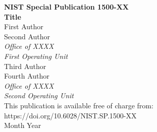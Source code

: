 \documentclass[12pt]{article}
\newcommand{\pubnumber}{1500-XX}
\newcommand{\DOI}{https://doi.org/10.6028/NIST.SP.1500-XX}
\newcommand{\monthyear}{Month Year}
\begin{document}
\begin{titlepage}
\begin{flushright}
\LARGE{\textbf{NIST Special Publication \pubnumber}}\\
\vfill 
\Huge{\textbf{Title}}\\
\vfill
\normalsize First Author\\
Second Author\\
\textit{Office of XXXX}\\
\textit{First Operating Unit}\\
\vspace{12pt}
Third Author\\
Fourth Author\\
\textit{Office of XXXX}\\
\textit{Second Operating Unit}\\
\vfill
\normalsize This publication is available free of charge from:\\
\DOI\\
\vfill
\normalsize \monthyear
\vfill


\end{flushright}
\end{titlepage}
\end{document}
